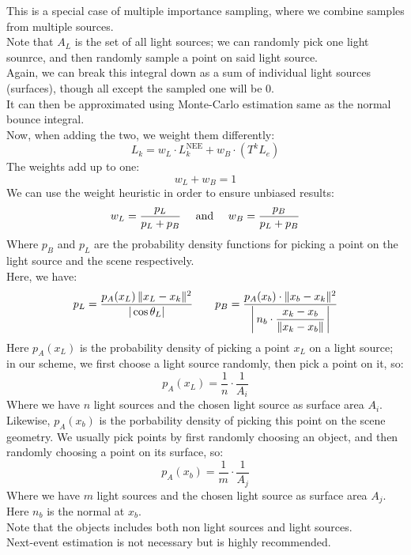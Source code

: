 \documentclass[12pt]{article}
\begin{document}
This is a special case of multiple importance sampling,
where we combine samples from multiple sources. \\

Note that $A_L$ is the set of all light sources;
we can randomly pick one light sounrce, and then
randomly sample a point on said light source. \\
Again, we can break this integral down
as a sum of individual light sources (surfaces),
though all except the sampled one will be $0$. \\

It can then be approximated using Monte-Carlo
estimation same as the normal bounce integral. \\

Now, when adding the two, we weight them differently:
\[ L_k = w_L \cdot L_k^\text{NEE} 
+ w_B \cdot (T^k L_e) \]
The weights add up to one:
\[ w_L + w_B = 1 \]
We can use the weight heuristic in order 
to ensure unbiased results:
\[ w_L = \dfrac{p_L}{p_L + p_B}
\quad \AND \quad
w_B = \dfrac{p_B}{p_L + p_B} \]
Where $p_B$ and $p_L$ are the probability density 
functions for picking a point on the light source
and the scene respectively. \\

Here, we have:
\[ p_L = \frac{p_A(x_L) \, \|x_L - x_k\|^2}
{|\cos\theta_L|} \qquad
p_B = \frac{p_A(x_b) 
\cdot \|x_b - x_k\|^2}{\left| \hs{2} n_b \cdot 
\dfrac{x_k - x_b}{\|x_k - x_b\|} \hs{1} \right|} \]
Here $p_A(x_L)$ is the probability density of picking
a point $x_L$ on a light source;
in our scheme, we first choose a light source
randomly, then pick a point on it, so:
\[ p_A(x_L) = \dfrac{1}{n} \cdot \dfrac{1}{A_i} \]
Where we have $n$ light sources and the chosen
light source as surface area $A_i$. \\
Likewise, $p_A(x_b)$
is the porbability density of picking
this point on the scene geometry.
We usually pick points by first randomly
choosing an object, and then randomly
choosing a point on its surface, so:
\[ p_A(x_b) = \dfrac{1}{m} \cdot \dfrac{1}{A_j} \]
Where we have $m$ light sources and the chosen
light source as surface area $A_j$. 
Here $n_b$ is the normal at $x_b$. \\
Note that the objects includes both non
light sources and light sources. \\

Next-event estimation is not necessary but is
highly recommended. \\
\end{document}
